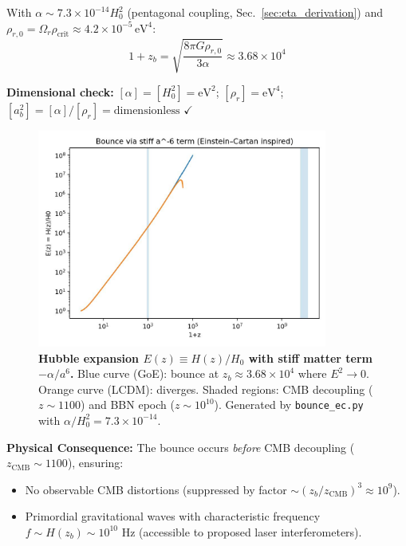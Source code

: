 \documentclass[12pt]{article}
\begin{document}
With $\alpha \sim 7.3 \times 10^{-14} H_0^2$ (pentagonal coupling, Sec.~\ref{sec:eta_derivation}) and $\rho_{r,0} = \Omega_r \rho_{\text{crit}} \approx 4.2 \times 10^{-5} \, \text{eV}^4$:
\begin{equation}
1 + z_b = \sqrt{\frac{8\pi G \rho_{r,0}}{3\alpha}} \approx 3.68 \times 10^4
\end{equation}

\textbf{Dimensional check:} $[\alpha] = [H_0^2] = \text{eV}^2$; $[\rho_r] = \text{eV}^4$; $[a_b^2] = [\alpha]/[\rho_r] = \text{dimensionless}$ $\checkmark$

\begin{figure}[h]
\centering
\includegraphics[width=0.85\textwidth]{figures/Ez_bounce.pdf}
\caption{\textbf{Hubble expansion $E(z) \equiv H(z)/H_0$ with stiff matter term $-\alpha/a^6$.} Blue curve (GoE): bounce at $z_b \approx 3.68 \times 10^4$ where $E^2 \to 0$. Orange curve (LCDM): diverges. Shaded regions: CMB decoupling ($z \sim 1100$) and BBN epoch ($z \sim 10^{10}$). Generated by \texttt{bounce\_ec.py} with $\alpha/H_0^2 = 7.3 \times 10^{-14}$.}
\label{fig:Ez_bounce}
\end{figure}

\textbf{Physical Consequence:} The bounce occurs \textit{before} CMB decoupling ($z_{\text{CMB}} \sim 1100$), ensuring:
\begin{itemize}
\item No observable CMB distortions (suppressed by factor $\sim (z_b/z_{\text{CMB}})^3 \approx 10^9$).
\item Primordial gravitational waves with characteristic frequency $f \sim H(z_b) \sim 10^{10}$ Hz (accessible to proposed laser interferometers).
\end{itemize}
\end{document}
